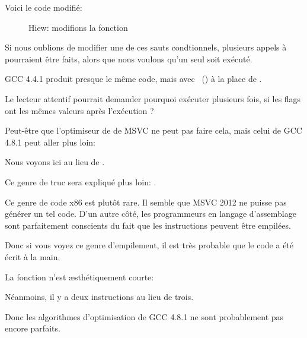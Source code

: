 \clearpage
Voici le code modifié:

\begin{figure}[H]
\centering
{}
\caption{Hiew: modifions la fonction }
\label{fig:jcc_hiew_2}
\end{figure}

Si nous oublions de modifier une de ces sauts condtionnels, plusieurs appels à \printf
pourraient être faits, alors que nous voulons qu'un seul soit exécuté.


GCC 4.4.1 \NonOptimizing produit presque le même code, mais avec \puts~()
à la place de \printf.


Le lecteur attentif pourrait demander pourquoi exécuter \CMP plusieurs fois, si
les flags ont les mêmes valeurs après l'exécution ?

Peut-être que l'optimiseur de de MSVC ne peut pas faire cela, mais celui de GCC
4.8.1 peut aller plus loin:



Nous voyons ici  au lieu de .

Ce genre de truc sera expliqué plus loin: .

Ce genre de code x86 est plutôt rare.
Il semble que MSVC 2012 ne puisse pas générer un tel code.
D'un autre côté, les programmeurs en langage d'assemblage sont parfaitement conscients
du fait que les instructions  peuvent être empilées.

Donc si vous voyez ce genre d'empilement, il est très probable que le code a été
écrit à la main.

La fonction  n'est \ae{}sthétiquement courte:



Néanmoins, il y a deux instructions  au lieu de trois.

Donc les algorithmes d'optimisation de GCC 4.8.1 ne sont probablement pas encore parfaits.

